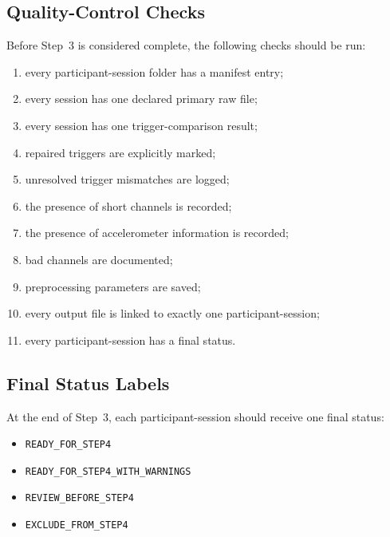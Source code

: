 \subsection{Quality-Control Checks}
Before Step~3 is considered complete, the following checks should be run:
\begin{enumerate}
    \item every participant-session folder has a manifest entry;
    \item every session has one declared primary raw file;
    \item every session has one trigger-comparison result;
    \item repaired triggers are explicitly marked;
    \item unresolved trigger mismatches are logged;
    \item the presence of short channels is recorded;
    \item the presence of accelerometer information is recorded;
    \item bad channels are documented;
    \item preprocessing parameters are saved;
    \item every output file is linked to exactly one participant-session;
    \item every participant-session has a final status.
\end{enumerate}

\subsection{Final Status Labels}
At the end of Step~3, each participant-session should receive one final status:
\begin{itemize}
    \item \texttt{READY\_FOR\_STEP4}
    \item \texttt{READY\_FOR\_STEP4\_WITH\_WARNINGS}
    \item \texttt{REVIEW\_BEFORE\_STEP4}
    \item \texttt{EXCLUDE\_FROM\_STEP4}
\end{itemize}

